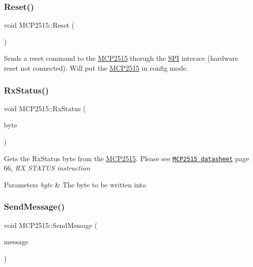 \subsubsection{\texorpdfstring{Reset()}{Reset()}}
{\footnotesize\ttfamily void M\+C\+P2515\+::\+Reset (\begin{DoxyParamCaption}{ }\end{DoxyParamCaption})\hspace{0.3cm}{\ttfamily [private]}}

Sends a reset command to the \hyperlink{class_m_c_p2515}{M\+C\+P2515} thorugh the \hyperlink{namespace_s_p_i}{S\+PI} interace (hardware reset not connected). Will put the \hyperlink{class_m_c_p2515}{M\+C\+P2515} in config mode. \hypertarget{class_m_c_p2515_af6853f82074a0be19d5a0516a959515e}{}\label{class_m_c_p2515_af6853f82074a0be19d5a0516a959515e} 
\subsubsection{\texorpdfstring{Rx\+Status()}{RxStatus()}}
{\footnotesize\ttfamily void M\+C\+P2515\+::\+Rx\+Status (\begin{DoxyParamCaption}\item[{uint8\+\_\+t \&}]{byte }\end{DoxyParamCaption})\hspace{0.3cm}{\ttfamily [private]}}

Gets the Rx\+Status byte from the \hyperlink{class_m_c_p2515}{M\+C\+P2515}. Please see \href{http://ww1.microchip.com/downloads/en/DeviceDoc/21801G.pdf}{\tt M\+C\+P2515 datasheet} page 66, {\itshape RX S\+T\+A\+T\+US instruction} 
\begin{DoxyParams}{Parameters}
{\em byte} & The byte to be written into \\
\hline
\end{DoxyParams}
\hypertarget{class_m_c_p2515_ade69da887eb514530ef5f73c0c3b0130}{}\label{class_m_c_p2515_ade69da887eb514530ef5f73c0c3b0130} 
\subsubsection{\texorpdfstring{Send\+Message()}{SendMessage()}}
{\footnotesize\ttfamily void M\+C\+P2515\+::\+Send\+Message (\begin{DoxyParamCaption}\item[{\hyperlink{struct_can_message}{Can\+Message} \&}]{message }\end{DoxyParamCaption})\hspace{0.3cm}{\ttfamily [virtual]}}

